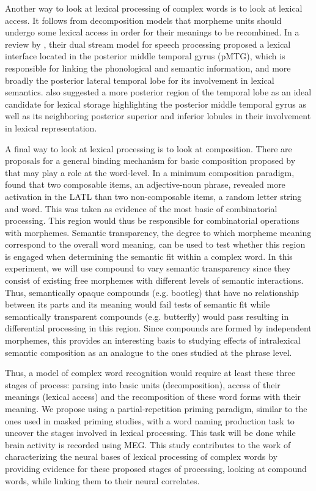 \documentclass{frontiersSCNS}
\begin{document}
	Another way to look at lexical processing of complex words is to look at lexical access. It follows from decomposition models that morpheme units should undergo some lexical access in order for their meanings to be recombined. In a review by \citet*{Hickok:2007}, their dual stream model for speech processing proposed a lexical interface located in the posterior middle temporal gyrus (pMTG), which is responsible for linking the phonological and semantic information, and more broadly the posterior lateral temporal lobe for its involvement in lexical semantics. \citet*{Lau:2008} also suggested a more posterior region of the temporal lobe as an ideal candidate for lexical storage highlighting the posterior middle temporal gyrus as well as its neighboring posterior superior and inferior lobules in their involvement in lexical representation.

	A final way to look at lexical processing is to look at composition. There are proposals for a general binding mechanism for basic composition proposed by \citet*{Bemis:2011} that may play a role at the word-level. In a minimum composition paradigm, \citep{Bemis:2011} found that two composable items, an adjective-noun phrase, revealed more activation in the LATL than two non-composable items, a random letter string and word. This was taken as evidence of the most basic of combinatorial processing. This region would thus be responsible for combinatorial operations with morphemes. Semantic transparency, the degree to which morpheme meaning correspond to the overall word meaning, can be used to test whether this region is engaged when determining the semantic fit within a complex word. In this experiment, we will use compound to vary semantic transparency since they consist of existing free morphemes with different levels of semantic interactions. Thus, semantically opaque compounds (e.g. bootleg) that have no relationship between its parts and its meaning would fail tests of semantic fit while semantically transparent compounds (e.g. butterfly) would pass resulting in differential processing in this region. Since compounds are formed by independent morphemes, this provides an interesting basis to studying effects of intralexical semantic composition as an analogue to the ones studied at the phrase level.

	Thus, a model of complex word recognition would require at least these three stages of process: parsing into basic units (decomposition), access of their meanings (lexical access) and the recomposition of these word forms with their meaning. We propose using a partial-repetition priming paradigm, similar to the ones used in masked priming studies, with a word naming production task to uncover the stages involved in lexical processing. This task will be done while brain activity is recorded using MEG. This study contributes to the work of characterizing the neural bases of lexical processing of complex words by providing evidence for these proposed stages of processing, looking at compound words, while linking them to their neural correlates.
\end{document}

